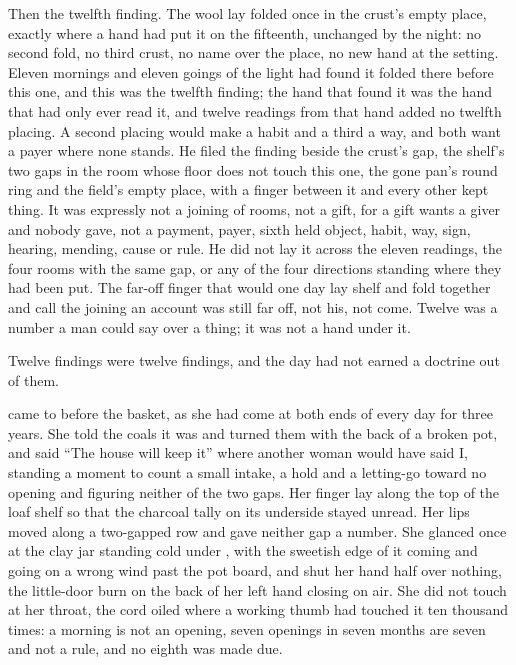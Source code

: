 Then the twelfth finding. The wool lay folded once in the crust's empty place, exactly where a hand had put it on the fifteenth, unchanged by the night: no second fold, no third crust, no name over the place, no new hand at the setting. Eleven mornings and eleven goings of the light had found it folded there before this one, and this was the twelfth finding; the hand that found it was the hand that had only ever read it, and twelve readings from that hand added no twelfth placing. A second placing would make a habit and a third a way, and both want a payer where none stands. He filed the finding beside the crust's gap, the shelf's two gaps in the room whose floor does not touch this one, the gone pan's round ring and the field's empty place, with a finger between it and every other kept thing. It was expressly not a joining of rooms, not a gift, for a gift wants a giver and nobody gave, not a payment, payer, sixth held object, habit, way, sign, hearing, mending, cause or rule. He did not lay it across the eleven readings, the four rooms with the same gap, or any of the four directions standing where they had been put. The far-off finger that would one day lay shelf and fold together and call the joining an account was still far off, not his, not come. Twelve was a number a man could say over a thing; it was not a hand under it.

Twelve findings were twelve findings, and the day had not earned a doctrine out of them.

 came to  before the basket, as she had come at both ends of every day for three years. She told the coals it was  and turned them with the back of a broken pot, and said “The house will keep it” where another woman would have said I, standing a moment to count a small intake, a hold and a letting-go toward no opening and figuring neither of the two gaps. Her finger lay along the top of the loaf shelf so that the charcoal tally on its underside stayed unread. Her lips moved along a two-gapped row and gave neither gap a number. She glanced once at the clay jar standing cold under , with the sweetish edge of it coming and going on a wrong wind past the pot board, and shut her hand half over nothing, the little-door burn on the back of her left hand closing on air. She did not touch  at her throat, the cord oiled where a working thumb had touched it ten thousand times: a morning is not an opening, seven openings in seven months are seven and not a rule, and no eighth was made due.

